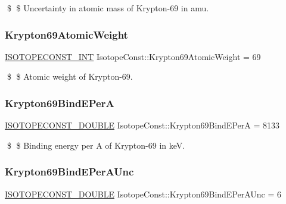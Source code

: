 \$ \$ Uncertainty in atomic mass of Krypton-\/69 in amu. \mbox{\label{group___isotope_const-_krypton-_kr69_gabe918a4c70a42747cafc009ee599786a}} 
\subsubsection{\texorpdfstring{Krypton69\+Atomic\+Weight}{Krypton69AtomicWeight}}
{\footnotesize\ttfamily \mbox{\hyperlink{group___isotope_const-_macros_ga5f18360b3e99483a35c32d789e62621c}{I\+S\+O\+T\+O\+P\+E\+C\+O\+N\+S\+T\+\_\+\+I\+NT}} Isotope\+Const\+::\+Krypton69\+Atomic\+Weight = 69}

\$ \$ Atomic weight of Krypton-\/69. \mbox{\label{group___isotope_const-_krypton-_kr69_ga2f5d5d98621cedac7e24077a99b73d27}} 
\subsubsection{\texorpdfstring{Krypton69\+Bind\+E\+PerA}{Krypton69BindEPerA}}
{\footnotesize\ttfamily \mbox{\hyperlink{group___isotope_const-_macros_ga8f45a7272ce02c0b4c65c44636ed719a}{I\+S\+O\+T\+O\+P\+E\+C\+O\+N\+S\+T\+\_\+\+D\+O\+U\+B\+LE}} Isotope\+Const\+::\+Krypton69\+Bind\+E\+PerA = 8133}

\$ \$ Binding energy per A of Krypton-\/69 in keV. \mbox{\label{group___isotope_const-_krypton-_kr69_ga7cb776870c7537b1767280d24df64b7f}} 
\subsubsection{\texorpdfstring{Krypton69\+Bind\+E\+Per\+A\+Unc}{Krypton69BindEPerAUnc}}
{\footnotesize\ttfamily \mbox{\hyperlink{group___isotope_const-_macros_ga8f45a7272ce02c0b4c65c44636ed719a}{I\+S\+O\+T\+O\+P\+E\+C\+O\+N\+S\+T\+\_\+\+D\+O\+U\+B\+LE}} Isotope\+Const\+::\+Krypton69\+Bind\+E\+Per\+A\+Unc = 6}

